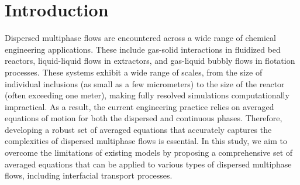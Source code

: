 
\section{Introduction}


Dispersed multiphase flows are encountered across a wide range of chemical engineering applications. 
These include gas-solid interactions in fluidized bed reactors, liquid-liquid flows in extractors, and gas-liquid bubbly flows in flotation processes. 
These systems exhibit a wide range of scales, from the size of individual inclusions (as small as a few micrometers) to the size of the reactor (often exceeding one meter), making fully resolved simulations computationally impractical. 
As a result, the current engineering practice relies on averaged equations of motion for both the dispersed and continuous phases. 
Therefore, developing a robust set of averaged equations that accurately captures the complexities of dispersed multiphase flows is essential. 
In this study, we aim to overcome the limitations of existing models by proposing a comprehensive set of averaged equations that can be applied to various types of dispersed multiphase flows, including interfacial transport processes.


